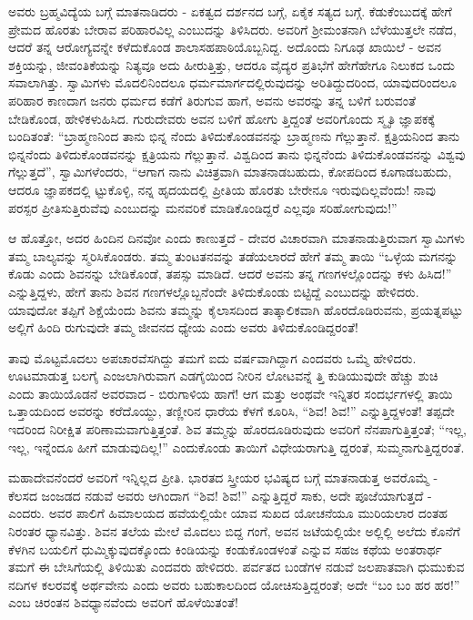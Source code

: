 ಅವರು ಬ್ರಹ್ಮವಿದ್ಯೆಯ ಬಗ್ಗೆ ಮಾತನಾಡಿದರು - ಏಕತ್ವದ ದರ್ಶನದ ಬಗ್ಗೆ, ಏಕೈಕ ಸತ್ಯದ ಬಗ್ಗೆ. ಕೆಡುಕೆಂಬುದಕ್ಕೆ ಹೇಗೆ ಪ್ರೇಮದ ಹೊರತು ಬೇರಾವ ಪರಿಹಾರವಿಲ್ಲ ಎಂಬುದನ್ನು ತಿಳಿಸಿದರು. ಅವರಿಗೆ ಶ‍್ರೀಮಂತನಾಗಿ ಬೆಳೆಯುತ್ತಲೇ ನಡೆದ, ಆದರೆ ತನ್ನ ಆರೋಗ್ಯವನ್ನೇ ಕಳೆದುಕೊಂಡ ಶಾಲಾಸಹಪಾಠಿಯೊಬ್ಬನಿದ್ದ. ಅದೊಂದು ನಿಗೂಢ ಖಾಯಿಲೆ - ಅವನ ಶಕ್ತಿಯನ್ನು, ಜೀವಂತಿಕೆಯನ್ನು ನಿತ್ಯವೂ ಅದು ಹೀರುತ್ತಿತ್ತು, ಆದರೂ ವೈದ್ಯರ ಪ್ರತಿಭೆಗೆ ಹೇಗೆಹೇಗೂ ನಿಲುಕದ ಒಂದು ಸವಾಲಾಗಿತ್ತು. ಸ್ವಾಮಿಗಳು ಮೊದಲಿನಿಂದಲೂ ಧರ್ಮಮಾರ್ಗದಲ್ಲಿರುವುದನ್ನು ಅರಿತಿದ್ದುದರಿಂದ, ಯಾವುದರಿಂದಲೂ ಪರಿಹಾರ ಕಾಣದಾಗ ಜನರು ಧರ್ಮದ ಕಡೆಗೆ ತಿರುಗುವ ಹಾಗೆ, ಅವನು ಅವರನ್ನು ತನ್ನ ಬಳಿಗೆ ಬರುವಂತೆ ಬೇಡಿಕೊಂಡ, ಹೇಳಿಕಳುಹಿಸಿದ. ಗುರುದೇವರು ಅವನ ಬಳಿಗೆ ಹೋಗು ತ್ತಿದ್ದಂತೆ ಅವರಿಗೊಂದು ಸ್ಮೃತಿ ಜ್ಞಾಪಕಕ್ಕೆ ಬಂದಿತಂತೆ: “ಬ್ರಾಹ್ಮಣನಿಂದ ತಾನು ಭಿನ್ನ ನೆಂದು ತಿಳಿದುಕೊಂಡವನನ್ನು ಬ್ರಾಹ್ಮಣನು ಗೆಲ್ಲುತ್ತಾನೆ. ಕ್ಷತ್ರಿಯನಿಂದ ತಾನು ಭಿನ್ನನೆಂದು ತಿಳಿದುಕೊಂಡವನನ್ನು ಕ್ಷತ್ರಿಯನು ಗೆಲ್ಲುತ್ತಾನೆ. ವಿಶ್ವದಿಂದ ತಾನು ಭಿನ್ನನೆಂದು ತಿಳಿದುಕೊಂಡವನನ್ನು ವಿಶ್ವವು ಗೆಲ್ಲುತ್ತದೆ”, ಸ್ವಾಮಿಗಳೆಂದರು, “ಆಗಾಗ ನಾನು ವಿಚಿತ್ರವಾಗಿ ಮಾತನಾಡಬಹುದು, ಕೋಪದಿಂದ ಕೂಗಾಡಬಹುದು, ಆದರೂ ಜ್ಞಾಪಕದಲ್ಲಿ ಟ್ಟುಕೊಳ್ಳಿ, ನನ್ನ ಹೃದಯದಲ್ಲಿ ಪ್ರೀತಿಯ ಹೊರತು ಬೇರೇನೂ ಇರುವುದಿಲ್ಲವೆಂದು! ನಾವು ಪರಸ್ಪರ ಪ್ರೀತಿಸುತ್ತಿರುವೆವು ಎಂಬುದನ್ನು ಮನವರಿಕೆ ಮಾಡಿಕೊಂಡಿದ್ದರೆ ಎಲ್ಲವೂ ಸರಿಹೋಗುವುದು!”

ಆ ಹೊತ್ತೋ, ಅದರ ಹಿಂದಿನ ದಿನವೋ ಎಂದು ಕಾಣುತ್ತದೆ - ದೇವರ ವಿಚಾರವಾಗಿ ಮಾತನಾಡುತ್ತಿರುವಾಗ ಸ್ವಾಮಿಗಳು ತಮ್ಮ ಬಾಲ್ಯವನ್ನು ಸ್ಮರಿಸಿಕೊಂಡರು. ತಮ್ಮ ತುಂಟತನವನ್ನು ತಡೆಯಲಾರದೆ ಹೇಗೆ ತಮ್ಮ ತಾಯಿ “ಒಳ್ಳೆಯ ಮಗನನ್ನು ಕೊಡು ಎಂದು ಶಿವನನ್ನು ಬೇಡಿಕೊಂಡೆ, ತಪಸ್ಸು ಮಾಡಿದೆ. ಆದರೆ ಅವನು ತನ್ನ ಗಣಗಳಲ್ಲೊಂದನ್ನು ಕಳು ಹಿಸಿದ!” ಎನ್ನುತ್ತಿದ್ದಳು, ಹೇಗೆ ತಾನು ಶಿವನ ಗಣಗಳಲ್ಲೊಬ್ಬನೆಂದೇ ತಿಳಿದುಕೊಂಡು ಬಿಟ್ಟಿದ್ದೆ ಎಂಬುದನ್ನು ಹೇಳಿದರು. ಯಾವುದೋ ತಪ್ಪಿಗೆ ಶಿಕ್ಷೆಯೆಂದು ಶಿವನು ತಮ್ಮನ್ನು ಕೈಲಾಸದಿಂದ ತಾತ್ಕಾಲಿಕವಾಗಿ ಹೊರದೊಡಿರುವನು, ಪ್ರಯತ್ನಪಟ್ಟು ಅಲ್ಲಿಗೆ ಹಿಂದಿ ರುಗುವುದೇ ತಮ್ಮ ಜೀವನದ ಧ್ಯೇಯ ಎಂದು ಅವರು ತಿಳಿದುಕೊಂಡಿದ್ದರಂತೆ!

ತಾವು ಮೊಟ್ಟಮೊದಲು ಅಪಚಾರವೆಸಗಿದ್ದು ತಮಗೆ ಐದು ವರ್ಷವಾಗಿದ್ದಾಗ ಎಂದವರು ಒಮ್ಮೆ ಹೇಳಿದರು. ಊಟಮಾಡುತ್ತ ಬಲಗೈ ಎಂಜಲಾಗಿರುವಾಗ ಎಡಗೈಯಿಂದ ನೀರಿನ ಲೋಟವನ್ನೆ ತ್ತಿ ಕುಡಿಯುವುದೇ ಹೆಚ್ಚು ಶುಚಿ ಎಂದು ತಾಯಿಯೊಡನೆ ಅವರವಾದ - ಬಿರುಗಾಳಿಯ ಹಾಗೆ! ಆಗ ಮತ್ತು ಅಂಥವೇ ಇನ್ನಿತರ ಸಂದರ್ಭಗಳಲ್ಲಿ ತಾಯಿ ಒತ್ತಾಯದಿಂದ ಅವರನ್ನು ಕರೆದೊಯ್ದು, ತಣ್ಣೀರಿನ ಧಾರೆಯ ಕೆಳಗೆ ಕೂರಿಸಿ, “ಶಿವ! ಶಿವ!” ಎನ್ನುತ್ತಿದ್ದಳಂತೆ! ತಪ್ಪದೇ ಇದರಿಂದ ನಿರೀಕ್ಷಿತ ಪರಿಣಾಮವಾಗುತ್ತಿತ್ತಂತೆ. ಶಿವ ತಮ್ಮನ್ನು ಹೊರದೂಡಿರುವುದು ಅವರಿಗೆ ನೆನಪಾಗುತ್ತಿತ್ತಂತೆ; “ಇಲ್ಲ, ಇಲ್ಲ, ಇನ್ನೆಂದೂ ಹೀಗೆ ಮಾಡುವುದಿಲ್ಲ!” ಎಂದುಕೊಂಡು ತಾಯಿಗೆ ವಿಧೇಯರಾಗುತ್ತಿ ದ್ದರಂತೆ, ಸುಮ್ಮನಾಗುತ್ತಿದ್ದರಂತೆ.

ಮಹಾದೇವನೆಂದರೆ ಅವರಿಗೆ ಇನ್ನಿಲ್ಲದ ಪ್ರೀತಿ. ಭಾರತದ ಸ್ತ್ರೀಯರ ಭವಿಷ್ಯದ ಬಗ್ಗೆ ಮಾತನಾಡುತ್ತ ಅವರೊಮ್ಮೆ - ಕೆಲಸದ ಜಂಜಡದ ನಡುವೆ ಅವರು ಆಗಿಂದಾಗ “ಶಿವ! ಶಿವ!” ಎನ್ನುತ್ತಿದ್ದರೆ ಸಾಕು, ಅದೇ ಪೂಜೆಯಾಗುತ್ತದೆ - ಎಂದರು. ಅವರ ಪಾಲಿಗೆ ಹಿಮಾಲಯದ ಹವೆಯಲ್ಲಿಯೇ ಯಾವ ಸುಖದ ಯೋಚನೆಯೂ ಮುರಿಯಲಾರ ದಂತಹ ನಿರಂತರ ಧ್ಯಾನವಿತ್ತು. ಶಿವನ ತಲೆಯ ಮೇಲೆ ಮೊದಲು ಬಿದ್ದ ಗಂಗೆ, ಅವನ ಜಟೆಯಲ್ಲಿಯೇ ಅಲ್ಲಿಲ್ಲಿ ಅಲೆದು ಕೊನೆಗೆ ಕೆಳಗಿನ ಬಯಲಿಗೆ ಧುಮ್ಮಿಕ್ಕುವುದಕ್ಕೊಂದು ಕಿಂಡಿಯನ್ನು ಕಂಡುಕೊಂಡಳಂತೆ ಎನ್ನುವ ಸಹಜ ಕಥೆಯ ಅಂತರಾರ್ಥ ತಮಗೆ ಈ ಬೇಸಿಗೆಯಲ್ಲಿ ತಿಳಿಯಿತು ಎಂದವರು ಹೇಳಿದರು. ಪರ್ವತದ ಬಂಡೆಗಳ ನಡುವೆ ಜಲಪಾತವಾಗಿ ಧುಮುಕುವ ನದಿಗಳ ಕಲರವಕ್ಕೆ ಅರ್ಥವೇನು ಎಂದು ಅವರು ಬಹುಕಾಲದಿಂದ ಯೋಚಿಸುತ್ತಿದ್ದರಂತೆ; ಅದೇ “ಬಂ ಬಂ ಹರ ಹರ!” ಎಂಬ ಚಿರಂತನ ಶಿವಧ್ಯಾನವೆಂದು ಅವರಿಗೆ ಹೊಳೆಯಿತಂತೆ!

